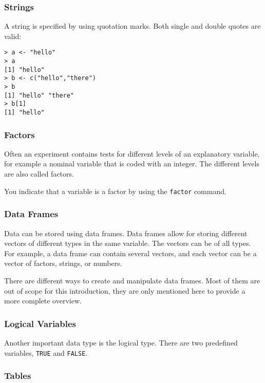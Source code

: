 \subsubsection{Strings}

A string is specified by using quotation marks. Both single and double quotes are valid:
\begin{lstlisting}
> a <- "hello"
> a
[1] "hello"
> b <- c("hello","there")
> b
[1] "hello" "there"
> b[1]
[1] "hello"
\end{lstlisting}

\subsubsection{Factors}

Often an experiment contains tests for different levels of an explanatory variable, for example a nominal variable that is coded with an integer. The different levels are also called factors.

You indicate that a variable is a factor by using the \texttt{factor} command.

\subsubsection{Data Frames}

Data can be stored using data frames. Data frames allow for storing different vectors of different types in the same variable. 
The vectors can be of all types. For example, a data frame can contain several vectors, and each vector can be a vector of factors, strings, or numbers.

There are different ways to create and manipulate data frames. Most of them are out of scope for this introduction, they are only mentioned here to provide a more complete overview.



\subsubsection{Logical Variables}

Another important data type is the logical type. There are two predefined variables, \texttt{TRUE} and \texttt{FALSE}.

\subsubsection{Tables}

